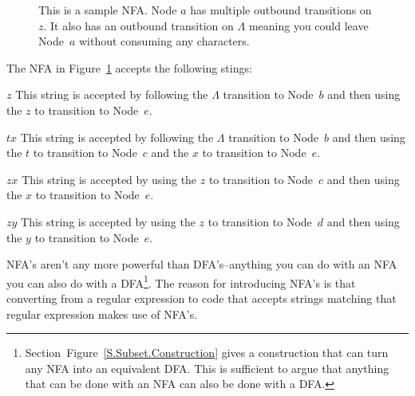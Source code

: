 \documentclass[letterpaper,12pt,openany,reqno]{book}%
\newcommand{\faterminalnode}[3] {\draw (#1) circle [radius=9pt]; \node at (#1) (#2) [circle, draw, minimum size=24pt] {#2};}
\newcommand{\fastart}[1] {\coordinate (start) at (#1);}
\newcommand{\fanonterminalnode}[2] {\node at (#1) (#2) [circle, draw, minimum size=24pt] {#2};}
\newcommand{\fatransition}[3] {\draw [-{Latex[length=3mm,width=2.5mm]}] (#1) -- (#2) node [midway, above] {#3};}
\newcommand{\farighttransition}[3] {\draw [-{Latex[length=3mm,width=2.5mm]}] (#1) -- (#2) node [midway, right] {#3};}
\newenvironment{mydesc}[1][9em]
  {
     \begin{basedescript}
     {
      \renewcommand{\makelabel}[1]{\bfseries##1}
      \desclabelwidth{ #1 }
      \desclabelstyle{\multilinelabel}
     }
  }
  {
     \end{basedescript}%
  }
\begin{document}
\begin{figure}[hbt]
\centering
{}
 \caption[Sample Non-deterministic Finite Automaton]{This is a sample NFA. Node $a$ has multiple outbound transitions on $z$. It also has an outbound transition on $\Lambda$ meaning you could leave Node~$a$ without consuming any characters.}
  \label{F.NFA_1}
\end{figure}

The NFA in Figure~\ref{F.NFA_1} accepts the following stings:
\begin{mydesc}[2em]
	\item[$z$] This string is accepted by following the $\Lambda$ transition to Node~$b$ and then using the $z$ to transition to Node~$e$.
	\item[$tx$] This string is accepted by following the $\Lambda$ transition to Node~$b$ and then using the $t$ to transition to Node~$c$ and the $x$ to transition to Node~$e$.
	\item[$zx$] This string is accepted by using the $z$ to transition to Node~$c$ and then using the $x$ to transition to Node~$e$.
	\item[$zy$] This string is accepted by using the $z$ to transition to Node~$d$ and then using the $y$ to transition to Node~$e$.
\end{mydesc}

NFA's aren't any more powerful than DFA's--anything you can do with an NFA you can also do with a DFA\footnote{Section~Figure~\ref{S.Subset.Construction} gives a construction that can turn any NFA into an equivalent DFA. This is sufficient to argue that anything that can be done with an NFA can also be done with a DFA.}. The reason for introducing NFA's is that converting from a regular expression to code that accepts strings matching that regular expression makes use of NFA's.
\end{document}

